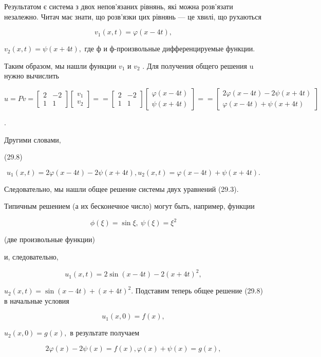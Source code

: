 \documentclass[
  ukrainian,
]{article}
\begin{document}
Результатом є система з двох непов'язаних рівнянь, які можна розв'язати
незалежно. Читач має знати, що розв'язки цих рівнянь --- це хвилі, що
рухаються

\[
v_1(x, t) = \varphi(x-4t),
\]

\(v_2(x, t) = \psi(x+4t),\) где ф и ф-произвольные дифференцируемые
функции.

Таким образом, мы нашли функции \(v_1\) и \(v_2\) . Для получения общего
решения u нужно вычислить

\[
u = Pv =
\begin{bmatrix} 2 & -2 \\ 1 & 1 \end{bmatrix}
\begin{bmatrix} v_1 \\ v_2 \end{bmatrix}
=
=
\begin{bmatrix} 2 & -2 \\ 1 & 1 \end{bmatrix}
\begin{bmatrix} \varphi(x - 4t) \\ \psi(x + 4t) \end{bmatrix}
=
=
\begin{bmatrix} 2\varphi(x - 4t) - 2\psi(x + 4t) \\ \varphi(x - 4t) + \psi(x + 4t) \end{bmatrix}
\]

.

Другими словами,

(29.8)

\[
u_1(x, t) = 2\varphi(x-4t) - 2\psi(x+4t), u_2(x, t) = \varphi(x-4t) + \psi(x+4t).
\]

Следовательно, мы нашли общее решение системы двух уравнений (29.3).

Типичным решением (а их бесконечное число) могут быть, например, функции

\[
\phi(\xi) = \sin \xi, \ \psi(\xi) = \xi^2
\]

(две произвольные функции)

и, следовательно,

\[
u_1(x, t) = 2 \sin(x-4t) - 2(x+4t)^2,
\]

\(u_2(x, t) = \sin(x-4t) + (x+4t)^2.\) Подставим теперь общее решение
(29.8) в начальные условия

\[
u_1(x, 0) = f(x),
\]

\(u_2(x, 0) = g(x),\) в результате получаем

\[
2\varphi(x) - 2\psi(x) = f(x),
\varphi(x) + \psi(x) = g(x),
\]
\end{document}
